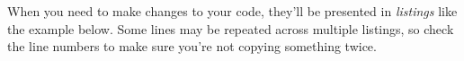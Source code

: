 	When you need to make changes to your code, they'll be presented in \textit{listings} like the example below. Some lines may be repeated across multiple listings, so check the line numbers to make sure you're not copying something twice.

	
	
	
	